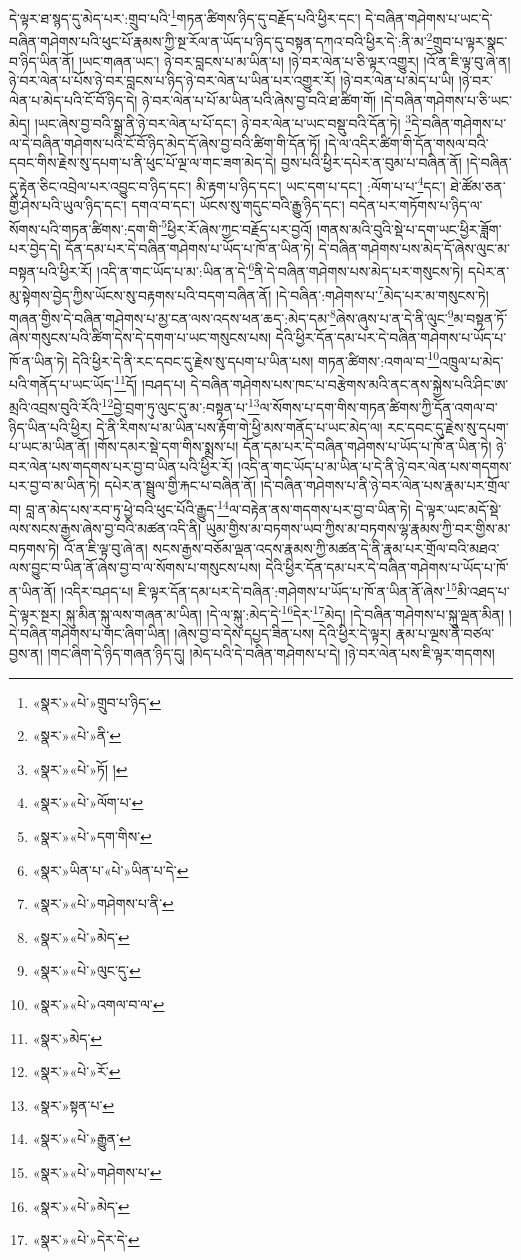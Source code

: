 དེ་ལྟར་ཐ་སྙད་དུ་མེད་པར་:གྲུབ་པའི་\footnote{«སྣར་»«པེ་»གྲུབ་པ་ཉིད་}གཏན་ཚིགས་ཉིད་དུ་བརྗོད་པའི་ཕྱིར་དང་། དེ་བཞིན་གཤེགས་པ་ཡང་དེ་བཞིན་གཤེགས་པའི་ཕུང་པོ་རྣམས་ཀྱི་སྔ་རོལ་ན་ཡོད་པ་ཉིད་དུ་བསྟན་དཀའ་བའི་ཕྱིར་དེ་:ནི་མ་\footnote{«སྣར་»«པེ་»ནི་}གྲུབ་པ་ལྟར་སྣང་བ་ཉིད་ཡིན་ནོ། །ཡང་གཞན་ཡང་། ཉེ་བར་བླངས་པ་མ་ཡིན་པ། །ཉེ་བར་ལེན་པ་ཅི་ལྟར་འགྱུར། །འོ་ན་ཇི་ལྟ་བུ་ཞེ་ན། ཉེ་བར་ལེན་པ་པོས་ཉེ་བར་བླངས་པ་ཉིད་ཉེ་བར་ལེན་པ་ཡིན་པར་འགྱུར་རོ། །ཉེ་བར་ལེན་པ་མེད་པ་ཡི། །ཉེ་བར་ལེན་པ་མེད་པའི་ངོ་བོ་ཉིད་དེ། ཉེ་བར་ལེན་པ་པོ་མ་ཡིན་པའི་ཞེས་བྱ་བའི་ཐ་ཚིག་གོ། །དེ་བཞིན་གཤེགས་པ་ཅི་ཡང་མེད། །ཡང་ཞེས་བྱ་བའི་སྒྲ་ནི་ཉེ་བར་ལེན་པ་པོ་དང་། ཉེ་བར་ལེན་པ་ཡང་བསྡུ་བའི་དོན་ཏེ། \footnote{«སྣར་»«པེ་»ཏོ། ། }དེ་བཞིན་གཤེགས་པ་ལ་དེ་བཞིན་གཤེགས་པའི་ངོ་བོ་ཉིད་མེད་དོ་ཞེས་བྱ་བའི་ཚིག་གི་དོན་ཏོ། །དེ་ལ་འདིར་ཚིག་གི་དོན་གསལ་བའི་དབང་གིས་རྗེས་སུ་དཔག་པ་ནི་ཕུང་པོ་ལྔ་ལ་གང་ཟག་མེད་དེ། བྱས་པའི་ཕྱིར་དཔེར་ན་བུམ་པ་བཞིན་ནོ། །དེ་བཞིན་དུ་རྟེན་ཅིང་འབྲེལ་པར་འབྱུང་བ་ཉིད་དང་། མི་རྟག་པ་ཉིད་དང་། ཡང་དག་པ་དང་། :ལོག་པ་པ་\footnote{«སྣར་»«པེ་»ལོག་པ་}དང་། ཐེ་ཚོམ་ཅན་གྱི་ཤེས་པའི་ཡུལ་ཉིད་དང་། དགའ་བ་དང་། ཡོངས་སུ་གདུང་བའི་རྒྱུ་ཉིད་དང་། བདེན་པར་གཏོགས་པ་ཉིད་ལ་སོགས་པའི་གཏན་ཚིགས་:དག་གི་\footnote{«སྣར་»«པེ་»དག་གིས་}ཕྱིར་རོ་ཞེས་ཀྱང་བརྗོད་པར་བྱའོ། །གནས་མའི་བུའི་སྡེ་པ་དག་ཡང་ཕྱིར་ཟློག་པར་བྱེད་དེ། དོན་དམ་པར་དེ་བཞིན་གཤེགས་པ་ཡོད་པ་ཁོ་ན་ཡིན་ཏེ། དེ་བཞིན་གཤེགས་པས་མེད་དོ་ཞེས་ལུང་མ་བསྟན་པའི་ཕྱིར་རོ། །འདི་ན་གང་ཡོད་པ་མ་:ཡིན་ན་དེ་\footnote{«སྣར་»ཡིན་པ་«པེ་»ཡིན་པ་དེ་}ནི་དེ་བཞིན་གཤེགས་པས་མེད་པར་གསུངས་ཏེ། དཔེར་ན་མུ་སྟེགས་བྱེད་ཀྱིས་ཡོངས་སུ་བརྟགས་པའི་བདག་བཞིན་ནོ། །དེ་བཞིན་:གཤེགས་པ་\footnote{«སྣར་»«པེ་»གཤེགས་པ་ནི་}མེད་པར་མ་གསུངས་ཏེ། གཞན་གྱིས་དེ་བཞིན་གཤེགས་པ་མྱ་ངན་ལས་འདས་ཕན་ཆད་:མེད་དམ་\footnote{«སྣར་»«པེ་»མེད་}ཞེས་ཞུས་པ་ན་དེ་ནི་ལུང་\footnote{«སྣར་»«པེ་»ལུང་དུ་}མ་བསྟན་ཏོ་ཞེས་གསུངས་པའི་ཚིག་དེས་དེ་དགག་པ་ཡང་གསུངས་པས། དེའི་ཕྱིར་དོན་དམ་པར་དེ་བཞིན་གཤེགས་པ་ཡོད་པ་ཁོ་ན་ཡིན་ཏེ། དེའི་ཕྱིར་དེ་ནི་རང་དབང་དུ་རྗེས་སུ་དཔག་པ་ཡིན་པས། གཏན་ཚིགས་:འགལ་བ་\footnote{«སྣར་»«པེ་»འགལ་བ་ལ་}འཁྲུལ་པ་མེད་པའི་གནོད་པ་ཡང་ཡོད་\footnote{«སྣར་»མེད་}དོ། །བཤད་པ། དེ་བཞིན་གཤེགས་པས་ཁང་པ་བརྩེགས་མའི་ནང་ནས་སྐྱེས་པའི་ཤིང་ཨ་མྲའི་འབྲས་བུའི་རོའི་\footnote{«སྣར་»«པེ་»རོ་}བྱེ་བྲག་ཏུ་ལུང་དུ་མ་:བསྟན་པ་\footnote{«སྣར་»སྟན་པ་}ལ་སོགས་པ་དག་གིས་གཏན་ཚིགས་ཀྱི་དོན་འགལ་བ་ཉིད་ཡིན་པའི་ཕྱིར། དེ་ནི་རིགས་པ་མ་ཡིན་པས་རྟོག་གེ་ཕྱི་མས་གནོད་པ་ཡང་མེད་ལ། རང་དབང་དུ་རྗེས་སུ་དཔག་པ་ཡང་མ་ཡིན་ནོ། །གོས་དམར་སྡེ་དག་གིས་སྨྲས་པ། དོན་དམ་པར་དེ་བཞིན་གཤེགས་པ་ཡོད་པ་ཁོ་ན་ཡིན་ཏེ། ཉེ་བར་ལེན་པས་གདགས་པར་བྱ་བ་ཡིན་པའི་ཕྱིར་རོ། །འདི་ན་གང་ཡོད་པ་མ་ཡིན་པ་དེ་ནི་ཉེ་བར་ལེན་པས་གདགས་པར་བྱ་བ་མ་ཡིན་ཏེ། དཔེར་ན་སྦྲུལ་གྱི་རྐང་པ་བཞིན་ནོ། །དེ་བཞིན་གཤེགས་པ་ནི་ཉེ་བར་ལེན་པས་རྣམ་པར་གྲོལ་བ། བླ་ན་མེད་པས་རབ་ཏུ་ཕྱེ་བའི་ཕུང་པོའི་རྒྱུད་\footnote{«སྣར་»«པེ་»རྒྱུན་}ལ་བརྟེན་ནས་གདགས་པར་བྱ་བ་ཡིན་ཏེ། དེ་ལྟར་ཡང་མདོ་སྡེ་ལས་སངས་རྒྱས་ཞེས་བྱ་བའི་མཚན་འདི་ནི། ཡུམ་གྱིས་མ་བཏགས་ཡབ་ཀྱིས་མ་བཏགས་ལྷ་རྣམས་ཀྱི་བར་གྱིས་མ་བཏགས་ཏེ། འོ་ན་ཇི་ལྟ་བུ་ཞེ་ན། སངས་རྒྱས་བཅོམ་ལྡན་འདས་རྣམས་ཀྱི་མཚན་དེ་ནི་རྣམ་པར་གྲོལ་བའི་མཐའ་ལས་བྱུང་བ་ཡིན་ནོ་ཞེས་བྱ་བ་ལ་སོགས་པ་གསུངས་པས། དེའི་ཕྱིར་དོན་དམ་པར་དེ་བཞིན་གཤེགས་པ་ཡོད་པ་ཁོ་ན་ཡིན་ནོ། །འདིར་བཤད་པ། ཇི་ལྟར་དོན་དམ་པར་དེ་བཞིན་:གཤེགས་པ་ཡོད་པ་ཁོ་ན་ཡིན་ནོ་ཞེས་\footnote{«སྣར་»«པེ་»གཤེགས་པ་}མི་འཐད་པ་དེ་ལྟར་སྔར། སྐུ་མིན་སྐུ་ལས་གཞན་མ་ཡིན། །དེ་ལ་སྐུ་:མེད་དེ་\footnote{«སྣར་»«པེ་»མེད་}དེར་\footnote{«སྣར་»«པེ་»དེར་དེ་}མེད། །དེ་བཞིན་གཤེགས་པ་སྐུ་ལྡན་མིན། །དེ་བཞིན་གཤེགས་པ་གང་ཞིག་ཡིན། །ཞེས་བྱ་བ་དེས་དཔྱད་ཟིན་པས། དེའི་ཕྱིར་དེ་ལྟར། རྣམ་པ་ལྔས་ནི་བཙལ་བྱས་ན། །གང་ཞིག་དེ་ཉིད་གཞན་ཉིད་དུ། །མེད་པའི་དེ་བཞིན་གཤེགས་པ་དེ། །ཉེ་བར་ལེན་པས་ཇི་ལྟར་གདགས། 